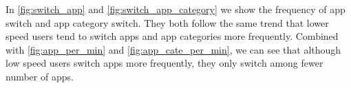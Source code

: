 In 
\autoref{fig:switch_app} and \autoref{fig:switch_app_category} 
we show the frequency of app switch and app category switch. They both follow the same trend that lower speed users tend to switch apps and app categories more frequently. Combined with 
\autoref{fig:app_per_min} and \autoref{fig:app_cate_per_min}, %
we can see that although low speed users switch apps more frequently, they only switch among fewer number of apps.

